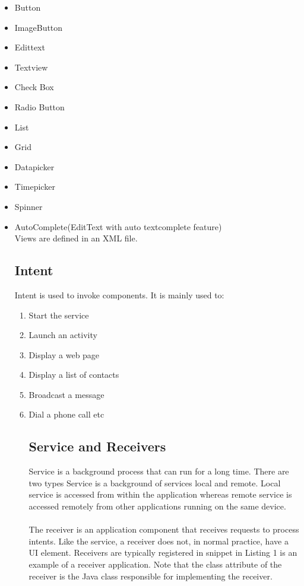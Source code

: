 \documentclass[twoside,a4paper,16pt]{book}
\begin{document}
\begin{itemize}
\item{Button}
\item{ImageButton}
\item{Edittext}
\item{Textview}
\item{Check Box}
\item{Radio Button}
\item{List}
\item{Grid}
\item{Datapicker}
\item{Timepicker}
\item{Spinner}
\item{AutoComplete(EditText with auto textcomplete feature)}\\
Views are defined in an XML file.\\

\subsection{Intent}
Intent is used to invoke components. It is mainly used to:
\begin{enumerate}
\item{Start the service}
\item{Launch an activity}
\item{Display a web page} 
\item{Display a list of contacts} 
\item{Broadcast a message}
\item{Dial a phone call etc}\\

 \subsection{Service and Receivers}
Service is a background process that can run for a long time. There are two types Service is a background of services local and remote. Local service is accessed from within the application whereas remote service is accessed remotely from other applications running on the same device.\\\\ 
The receiver is an application component that receives requests to process intents. Like the service, a receiver does not, in normal practice, have a UI element. Receivers are typically registered in snippet in Listing 1 is an example of a receiver application. Note that the class attribute of the receiver is the Java class responsible for implementing the receiver.\\


\end{enumerate}
\end{itemize}
\end{document}
